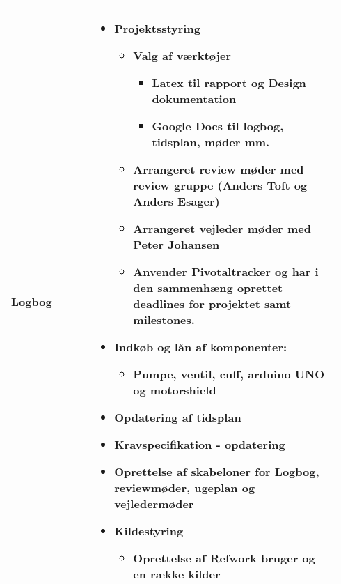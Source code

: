 \begin{longtable}{|p{0.24\linewidth}|p{0.7\linewidth}|}
		\\ \hline
		Logbog & 
		\begin{itemize}
		\item Projektsstyring
			\begin{itemize}
			\item Valg af værktøjer 
				\begin{itemize}
				\item Latex til rapport og Design dokumentation
				\item Google Docs til logbog, tidsplan, møder mm.
				\end{itemize}
			\item Arrangeret review møder med review gruppe (Anders Toft og Anders Esager)
			\item Arrangeret vejleder møder med Peter Johansen
			\item Anvender Pivotaltracker og har i den sammenhæng oprettet deadlines for projektet samt milestones.
			\end{itemize}
		\item Indkøb og lån af komponenter:
			\begin{itemize}
			\item Pumpe, ventil, cuff, arduino UNO og motorshield
			\end{itemize}
		\item Opdatering af tidsplan
		\item Kravspecifikation - opdatering
		\item Oprettelse af skabeloner for Logbog, reviewmøder, ugeplan og vejledermøder 
		\item Kildestyring
			\begin{itemize}
		\item Oprettelse af Refwork bruger og en række kilder
			\end{itemize}
		\end{itemize}
		\\ \hline
	\end{longtable}
	
